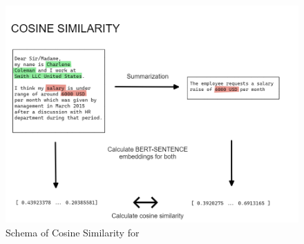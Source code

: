 \begin{figure}[h] 
    \includegraphics[width=\textwidth]{images/cosine_similarity.png}
    \caption{Schema of Cosine Similarity for }
    \label{fig:schema_cosine_similarity}
\end{figure}    




